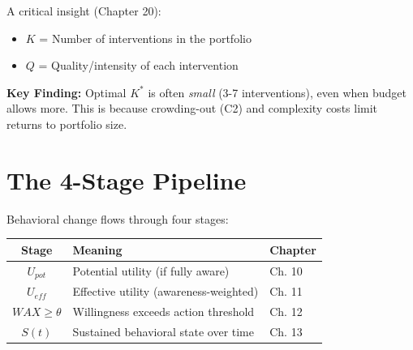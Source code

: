 A critical insight (Chapter 20):
\begin{itemize}
    \item $K$ = Number of interventions in the portfolio
    \item $Q$ = Quality/intensity of each intervention
\end{itemize}

\textbf{Key Finding:} Optimal $K^*$ is often \textit{small} (3-7 interventions), even when budget allows more. This is because crowding-out (C2) and complexity costs limit returns to portfolio size.


\section{The 4-Stage Pipeline}
\label{sec:25-pipeline}

Behavioral change flows through four stages:

\begin{tcolorbox}[colback=blue!5!white,colframe=blue!75!black,
    title=\textbf{The 4-Stage Pipeline}]
\begin{center}
\end{center}

\vspace{0.5em}
\begin{tabular}{|c|l|l|}
\hline
\textbf{Stage} & \textbf{Meaning} & \textbf{Chapter} \\
\hline
$U_{pot}$ & Potential utility (if fully aware) & Ch. 10 \\
$U_{eff}$ & Effective utility (awareness-weighted) & Ch. 11 \\
$WAX \geq \theta$ & Willingness exceeds action threshold & Ch. 12 \\
$S(t)$ & Sustained behavioral state over time & Ch. 13 \\
\hline
\end{tabular}
\end{tcolorbox}

